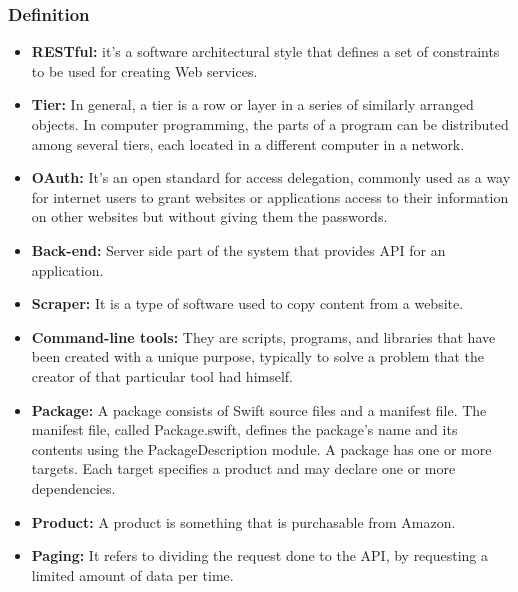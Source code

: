 \subsubsection{Definition}
\begin{itemize}
    \item \textbf{RESTful:} it's a software architectural style that defines a set of constraints to be used for creating Web services.
    \item \textbf{Tier:} In general, a tier is a row or layer in a series of similarly arranged objects. In computer programming, the parts of a program can be distributed among several tiers, each located in a different computer in a network.
    \item \textbf{OAuth:} It's an open standard for access delegation, commonly used as a way for internet users to grant websites or applications access to their information on other websites but without giving them the passwords.
    \item \textbf{Back-end:} Server side part of the system that provides API for an application.
    \item \textbf{Scraper:} It is a type of software used to copy content from a website.
    \item \textbf{Command-line tools:} They are scripts, programs, and libraries that have been created with a unique purpose, typically to solve a problem that the creator of that particular tool had himself.
    \item \textbf{Package:} A package consists of Swift source files and a manifest file. The manifest file, called Package.swift, defines the package’s name and its contents using the PackageDescription module. A package has one or more targets. Each target specifies a product and may declare one or more dependencies.
    \item \textbf{Product:} A product is something that is purchasable from Amazon.
    \item \textbf{Paging:} It refers to dividing the request done to the API, by requesting a limited amount of data per time.
\end{itemize}

